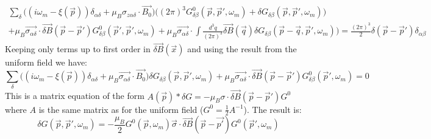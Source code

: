 \documentclass{article}
\begin{document}
\begin{align*}
\sum\limits_\delta \big((i\omega_m-\xi(\vec{p}))\delta_{\alpha\delta}+\mu_B\sigma_{z\alpha\delta}\cdot\vec{B_0}\big)\big((2\pi)^3G^0_{\delta\beta}(\vec{p},\vec{p}',\omega_m)+\delta G_{\delta\beta}(\vec{p},\vec{p}',\omega_m)\big)\\+\mu_B\vec{\sigma_{\alpha\delta}}\cdot\vec{\delta B}(\vec{p}-\vec{p}')G^0_{\delta\beta}(\vec{p}',\vec{p}',\omega_m)    +\mu_B\vec{\sigma_{\alpha\delta}}\cdot\int \frac{d^3q}{(2\pi)^3}\vec{\delta B}(\vec{q})\delta G_{\delta\beta}(\vec{p}-\vec{q},\vec{p}',\omega_m)\big)=\frac{(2\pi)^3}{2}\delta(\vec{p}-\vec{p}')\delta_{\alpha\beta}
\end{align*}
Keeping only terms up to first order in $\vec{\delta B}(\vec{x})$ and using the result from the uniform field we have:
\begin{equation}
\sum\limits_\delta \big((i\omega_m-\xi(\vec{p}))\delta_{\alpha\delta}+\mu_B\vec{\sigma_{\alpha\delta}}\cdot\vec{B_0}\big)\delta G_{\delta\beta}(\vec{p},\vec{p}',\omega_m)+\mu_B\vec{\sigma_{\alpha\delta}}\cdot\vec{\delta B}(\vec{p}-\vec{p}')G^0_{\delta\beta}(\vec{p}',\omega_m)=0
\end{equation}
This is a matrix equation of the form $A(\vec{p})*\delta G=-\mu_B\sigma\cdot\vec{\delta B}(\vec{p}-\vec{p}')G^0$ where $A$ is the same matrix as for the uniform field ($G^0=\frac{1}{2}A^{-1}$). The result is:
\begin{equation}
\delta G(\vec{p},\vec{p}',\omega_m)=-\frac{\mu_B}{2}G^0(\vec{p},\omega_m)\vec{\sigma}\cdot\vec{\delta B}(\vec{p}-\vec{p'})G^0(\vec{p}',\omega_m)
\end{equation}
\end{document}
